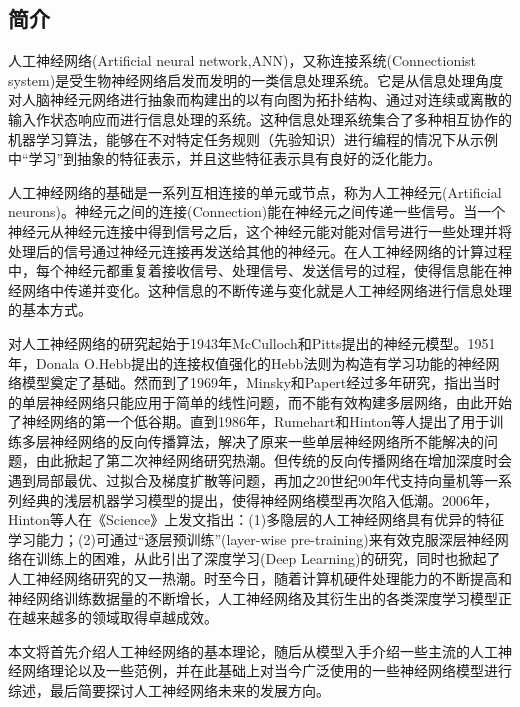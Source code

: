 \documentclass[a4paper]{ctexart}
\begin{document}
\begin{spacing}{1.3}
	\section{简介}
	人工神经网络(Artificial neural network,ANN)，又称连接系统(Connectionist system)是受生物神经网络启发而发明的一类信息处理系统。它是从信息处理角度对人脑神经元网络进行抽象而构建出的以有向图为拓扑结构、通过对连续或离散的输入作状态响应而进行信息处理的系统\cite{RN110}。这种信息处理系统集合了多种相互协作的机器学习算法，能够在不对特定任务规则（先验知识）进行编程的情况下从示例中“学习”到抽象的特征表示，并且这些特征表示具有良好的泛化能力\cite{RN114}\cite{RN113}。
	
	人工神经网络的基础是一系列互相连接的单元或节点，称为人工神经元(Artificial neurons)。神经元之间的连接(Connection)能在神经元之间传递一些信号。当一个神经元从神经元连接中得到信号之后，这个神经元能对能对信号进行一些处理并将处理后的信号通过神经元连接再发送给其他的神经元。在人工神经网络的计算过程中，每个神经元都重复着接收信号、处理信号、发送信号的过程，使得信息能在神经网络中传递并变化\cite{RN107}。这种信息的不断传递与变化就是人工神经网络进行信息处理的基本方式。

	对人工神经网络的研究起始于1943年McCulloch和Pitts提出的神经元模型\cite{RN120}。1951年，Donala O.Hebb提出的连接权值强化的Hebb法则\cite{RN124}为构造有学习功能的神经网络模型奠定了基础。然而到了1969年，Minsky和Papert经过多年研究，指出当时的单层神经网络只能应用于简单的线性问题，而不能有效构建多层网络\cite{RN126}，由此开始了神经网络的第一个低谷期。直到1986年，Rumehart和Hinton等人提出了用于训练多层神经网络的反向传播算法\cite{RN127}，解决了原来一些单层神经网络所不能解决的问题，由此掀起了第二次神经网络研究热潮。但传统的反向传播网络在增加深度时会遇到局部最优、过拟合及梯度扩散等问题，再加之20世纪90年代支持向量机\cite{RN128}等一系列经典的浅层机器学习模型的提出，使得神经网络模型再次陷入低潮。2006年，Hinton等人在《Science》上发文指出\cite{RN129}：(1)多隐层的人工神经网络具有优异的特征学习能力；(2)可通过“逐层预训练”(layer-wise pre-training)来有效克服深层神经网络在训练上的困难，从此引出了深度学习(Deep Learning)的研究，同时也掀起了人工神经网络研究的又一热潮\cite{RN112}。时至今日，随着计算机硬件处理能力的不断提高和神经网络训练数据量的不断增长，人工神经网络及其衍生出的各类深度学习模型正在越来越多的领域取得卓越成效。
	
	本文将首先介绍人工神经网络的基本理论，随后从模型入手介绍一些主流的人工神经网络理论以及一些范例，并在此基础上对当今广泛使用的一些神经网络模型进行综述，最后简要探讨人工神经网络未来的发展方向。


\end{spacing}
\end{document}
